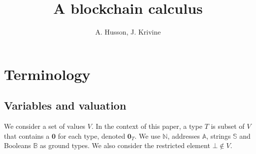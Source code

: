 \documentclass[14pt]{extarticle}
\begin{document}
\title{A blockchain calculus}
\author{A. Husson, J. Krivine}
\date{}
\maketitle

\def\Op{\mathsf{Op}}
\def\call#1{\mathtt{call}(#1)}
\def\dcall#1{\mathtt{dcall}(#1)}
\def\sstore#1{\mathtt{sstore}(#1)}
\def\sload#1{\mathtt{sload}(#1)}
\def\brd{\mathtt{rdata}}
\def\bcd{\mathtt{cdata}}
\def\hsh#1{\mathtt{hash}(#1)}


\def\return#1{\mathtt{return}(#1)}
\def\revert#1{\mathtt{revert}(#1)}
\def\switch#1{\mathtt{if}(#1)}
\def\while#1{\mathtt{while}(#1)}

\def\upd{\mathrel{\bf\langle\!+\!\!\mid}}
\def\eps{\epsilon}
\def\sig{\sigma}
\def\Nat{\mathbb{N}}
\def\Bool{\mathbb{B}}
\def\Addr{\mathbb{A}}
\def\Str{\mathbb{S}}
\def\tuple#1{\langle{#1}\rangle}
\def\z{\mathbf{0}}
\def\zVec{\langle\rangle}
\def\zVal{[]}


\def\Ctr{\mathsf{Ctr}}
\def\Abi{\alpha}
\def\Block{\mathbf{S}}
\def\tx{\mathtt{tx}}

\def\env{\varepsilon}

\def\gasspent{\gamma}
\def\gasmax{\Gamma}
\def\this{\mathop{\downarrow}}
\def\sender{\mathop{\uparrow}}
\def\rd{\varrho}
\def\retData{\vec\rd}
\def\cd{\chi}
\def\callData{\vec\cd}

\def\Byt{\mathtt{B}}

\def\Exec{\mathbf{E}}
\def\rlab#1{\;\mathtt{#1}}
\def\llab#1{\mathtt{#1}\;}
\def\comp{\mathrel{\|}}
\def\Pending{\mathsf{Pending}}
\def\Def{\mathsf{Def}}
\def\Require{\mathit{Require}}
\def\Revert{\mathit{Revert}}
\def\rar{\dashrightarrow}

\def\dcl{\delta_{\mathsf{call}}}
\def\dxp{\delta_{\mathsf{exp}}}
\def\dsw{\delta_{\mathsf{sw}}}
\def\dsr{\delta_{\mathsf{sr}}}
\def\dmr{\delta_{\mathsf{mr}}}
\def\denv{\delta_{\mathsf{env}}}
\def\dcd{\delta_{\mathsf{dcd}}}
\def\drd{\delta_{\mathsf{drd}}}

\def\OOG{\mathsf{OOG}}

\section{Terminology}

\subsection{Variables and valuation}
We consider a set of values $V$. In the context of this paper, a type $T$ is subset of $V$ that contains a $\z$ for each type, denoted $\z_T$. We use $\Nat$, addresses $\Addr$, strings $\Str$ and Booleans $\Bool$ as ground types. We also consider the restricted element $\bot\not\in V$.
\end{document}
